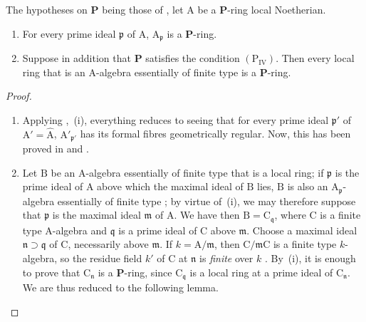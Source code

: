 \begin{theorem}[7.4.4]
\label{IV.7.4.4}
The hypotheses on $\boldsymbol{P}$ being those of , let $\mathrm{A}$ be a $\boldsymbol{P}$-ring local Noetherian.
\begin{enumerate}[label=\emph{\roman*)}]
  \item For every prime ideal $\mathfrak{p}$ of $\mathrm{A}$, $\mathrm{A}_\mathfrak{p}$ is a $\boldsymbol{P}$-ring.
  \item Suppose in addition that $\boldsymbol{P}$ satisfies the condition $(\mathrm{P_{IV}})$.
  Then every local ring that is an A-algebra essentially of finite type is a $\boldsymbol{P}$-ring.
\end{enumerate}
\end{theorem}

\begin{proof}
\begin{enumerate}[label=(\roman*)]
  \item Applying ,~(i), everything reduces to seeing that for every prime ideal $\mathfrak{p}'$ of $\mathrm{A}'=\widehat{\mathrm{A}}$, $\mathrm{A}'_{\mathfrak{p}'}$ has its formal fibres geometrically regular.
  Now, this has been proved in  and .

  \item Let $\mathrm{B}$ be an A-algebra essentially of finite type that is a local ring; if $\mathfrak{p}$ is the prime ideal of $\mathrm{A}$ above which the maximal ideal of $\mathrm{B}$ lies, $\mathrm{B}$ is also an $\mathrm{A}_\mathfrak{p}$-algebra essentially of finite type ; by virtue of~(i), we may therefore suppose that $\mathfrak{p}$ is the maximal ideal $\mathfrak{m}$ of $\mathrm{A}$.
  We have then $\mathrm{B}=\mathrm{C}_\mathfrak{q}$, where $\mathrm{C}$ is a finite type A-algebra and $\mathfrak{q}$ is a prime ideal of $\mathrm{C}$ above $\mathfrak{m}$. Choose a maximal ideal $\mathfrak{n}\supset\mathfrak{q}$ of $\mathrm{C}$, necessarily above $\mathfrak{m}$. If $k=\mathrm{A}/\mathfrak{m}$, then $\mathrm{C}/\mathfrak{m}\mathrm{C}$ is a finite type $k$-algebra, so the residue field $k'$ of $\mathrm{C}$ at $\mathfrak{n}$ is \emph{finite} over $k$ . By~(i), it is enough to prove that $\mathrm{C}_\mathfrak{n}$ is a $\boldsymbol{P}$-ring, since $\mathrm{C}_\mathfrak{q}$ is a local ring at a prime ideal of $\mathrm{C}_\mathfrak{n}$. We are thus reduced to the following lemma.
\end{enumerate}
\end{proof}

